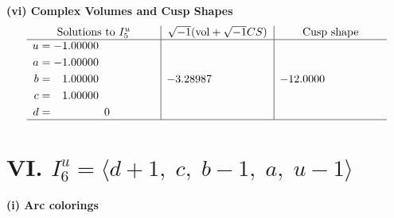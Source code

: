 \documentclass[1p]{elsarticle_modified}
\theoremstyle{definition}
\newcommand{\I}{\sqrt{-1}}
\begin{document}
\newpage\flushleft \textbf{(vi) Complex Volumes and Cusp Shapes}
$$\begin{array}{c|c|c}  
\text{Solutions to }I^u_{5}& \I (\text{vol} + \sqrt{-1}CS) & \text{Cusp shape}\\
 \hline 
\begin{aligned}
u &= -1.00000\phantom{ +0.000000I} \\
a &= -1.00000\phantom{ +0.000000I} \\
b &= \phantom{-}1.00000\phantom{ +0.000000I} \\
c &= \phantom{-}1.00000\phantom{ +0.000000I} \\
d &= \phantom{-0.000000 } 0\end{aligned}
 & -3.28987\phantom{ +0.000000I} & -12.0000\phantom{ +0.000000I}\\
 \hline 
 \end{array}$$\newpage\newpage\renewcommand{\arraystretch}{1}
\centering \section*{VI. $I^u_{6}= \langle d+1,\;c,\;b-1,\;a,\;u-1 \rangle$}
\flushleft \textbf{(i) Arc colorings}\\
\end{document}

